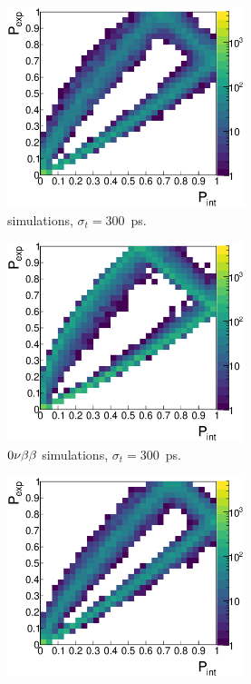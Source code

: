 \begin{figure}[!h]
\begin{subfigure}[t]{0.49\textwidth}
  \centering
  \includegraphics[width=0.76\textwidth]{timedifference/fig_timediff/PintVSPexp_208Tl_300.eps}
  \captionsetup{justification=justified}
  \caption{\Tl simulations, ${\sigma_{t}=300}$~ps.
    \label{subfig:}}
\end{subfigure}
\hfill
\begin{subfigure}[t]{0.49\textwidth}
  \centering
  \includegraphics[width=0.76\textwidth]{timedifference/fig_timediff/PintVSPexp_0nubb_300.eps}
  \captionsetup{justification=justified}
  \caption{$0\nu\beta\beta$ simulations, ${\sigma_{t}=300}$~ps.
    \label{subfig:}}
\end{subfigure}
\begin{subfigure}[t]{0.49\textwidth}
  \centering
  \includegraphics[width=0.76\textwidth]{timedifference/fig_timediff/PintVSPexp_208Tl_400.eps}

\end{subfigure}
\end{figure}
